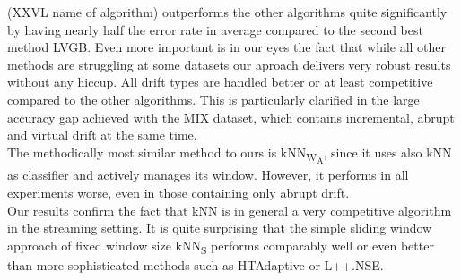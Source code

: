 \documentclass[conference]{IEEEtran}
\begin{document}
(XXVL name of algorithm) outperforms the other algorithms quite significantly by having nearly half the error rate in average compared to the second best method LVGB. 
Even more important is in our eyes the fact that while all other methods are struggling at some datasets our aproach delivers very robust results without any hiccup. All drift types are handled
better or at least competitive compared to the other algorithms. This is particularly clarified in the large accuracy gap achieved with the MIX dataset, which contains incremental, 
abrupt and virtual drift at the same time. \\
The methodically most similar method to ours is kNN\textsubscript{W\textsubscript{A}}, since it uses also kNN as classifier and actively manages its window.
However, it performs in all experiments worse, even in those containing only abrupt drift.\\
Our results confirm the fact that kNN is in general a very competitive algorithm in the streaming setting. It is quite surprising that the simple sliding window approach of fixed window size
kNN\textsubscript{S} performs comparably well or even better than more sophisticated methods such as HTAdaptive or L++.NSE.
\end{document}
